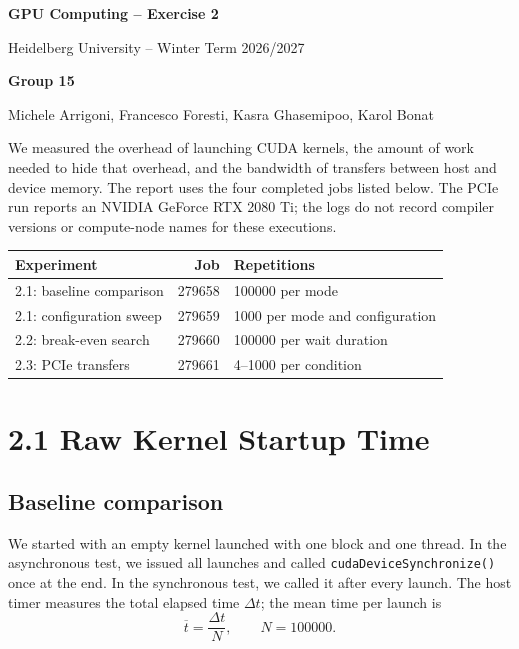 \documentclass[11pt,a4paper]{article}
\newcommand{\code}[1]{\texttt{#1}}
\begin{document}
\begin{center}
{\LARGE\bfseries GPU Computing -- Exercise 2}\par
\vspace{0.4em}
Heidelberg University -- Winter Term 2026/2027\par
\vspace{0.5em}
\textbf{Group 15}\par
Michele Arrigoni, Francesco Foresti, Kasra Ghasemipoo, Karol Bonat
\end{center}

We measured the overhead of launching CUDA kernels, the amount of work needed
to hide that overhead, and the bandwidth of transfers between host and device
memory. The report uses the four completed jobs listed below. The PCIe run
reports an NVIDIA GeForce RTX 2080 Ti; the logs do not record compiler versions
or compute-node names for these executions.

\begin{center}
\small
\begin{tabularx}{\linewidth}{@{}X r l@{}}
\toprule
Experiment & Job & Repetitions \\
\midrule
2.1: baseline comparison & 279658 & 100000 per mode \\
2.1: configuration sweep & 279659 & 1000 per mode and configuration \\
2.2: break-even search & 279660 & 100000 per wait duration \\
2.3: PCIe transfers & 279661 & 4--1000 per condition \\
\bottomrule
\end{tabularx}
\end{center}

\section*{2.1 Raw Kernel Startup Time}

\subsection*{Baseline comparison}
We started with an empty kernel launched with one block and one thread. In the
asynchronous test, we issued all launches and called
\code{cudaDeviceSynchronize()} once at the end. In the synchronous test, we
called it after every launch. The host timer measures the total elapsed time
\(\Delta t\); the mean time per launch is
\[
    \overline{t}=\frac{\Delta t}{N},\qquad N=100000.
\]
\end{document}

